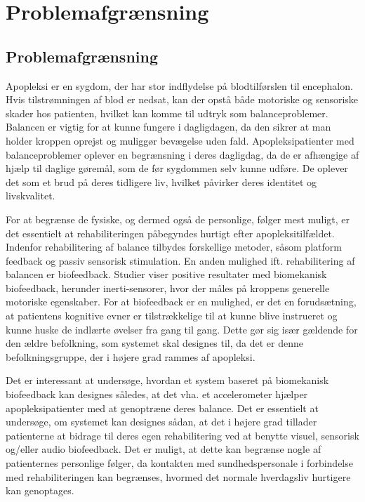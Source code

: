 \chapter{Problemafgrænsning}
\section{Problemafgrænsning}
Apopleksi er en sygdom, der har stor indflydelse på blodtilførslen til encephalon. Hvis tilstrømningen af blod er nedsat, kan der opstå både motoriske og sensoriske skader hos patienten, hvilket kan komme til udtryk som balanceproblemer. Balancen er vigtig for at kunne fungere i dagligdagen, da den sikrer at man holder kroppen oprejst og muliggør bevægelse uden fald. \cite{Nichols1997} Apopleksipatienter med balanceproblemer oplever en begrænsning i deres dagligdag, da de er afhængige af hjælp til daglige gøremål, som de før sygdommen selv kunne udføre. De oplever det som et brud på deres tidligere liv, hvilket påvirker deres identitet og livskvalitet.\cite{Sundhedsstyrelsen2010}

For at begrænse de fysiske, og dermed også de personlige, følger mest muligt, er det essentielt at rehabiliteringen påbegyndes hurtigt efter apopleksitilfældet. Indenfor rehabilitering af balance tilbydes forskellige metoder, såsom platform feedback og passiv sensorisk stimulation. En anden mulighed ift. rehabilitering af balancen er biofeedback. Studier viser positive resultater med biomekanisk biofeedback, herunder inerti-sensorer, hvor der måles på kroppens generelle motoriske egenskaber. \cite{Giggins2013} For at biofeedback er en mulighed, er det en forudsætning, at patientens kognitive evner er tilstrækkelige til at kunne blive instrueret og kunne huske de indlærte øvelser fra gang til gang. \cite{Middaugh1989} Dette gør sig især gældende for den ældre befolkning, som systemet skal designes til, da det er denne befolkningsgruppe, der i højere grad rammes af apopleksi. \cite{Sundhedsstyrelsen2011}

Det er interessant at undersøge, hvordan et system baseret på biomekanisk biofeedback kan designes således, at det vha. et accelerometer hjælper apopleksipatienter med at genoptræne deres balance. Det er essentielt at undersøge, om systemet kan designes sådan, at det i højere grad tillader patienterne at bidrage til deres egen rehabilitering ved at benytte visuel, sensorisk og/eller audio biofeedback. Det er muligt, at dette kan begrænse nogle af patienternes personlige følger, da kontakten med sundhedspersonale i forbindelse med rehabiliteringen kan begrænses, hvormed det normale hverdagsliv hurtigere kan genoptages. 

